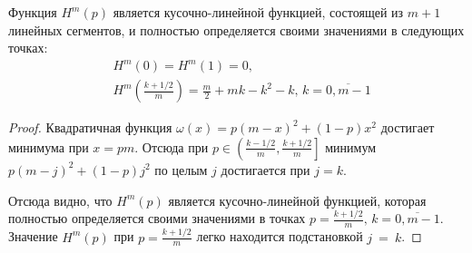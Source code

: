 \begin{lemma}
\label{lemma:upper_bound:function}
Функция $ H^m(p) $ является кусочно-линейной функцией, состоящей из $ m + 1 $ линейных сегментов, и полностью определяется своими значениями в следующих точках:
\begin{eqnarray*}
& H^m(0) = H^m(1) = 0, \\
& H^m\left(\frac{k+1/2}{m}\right) 
    = \frac{m}{2} + mk - k^2 - k, 
        \, k = \overline{0, m - 1}
\end{eqnarray*}
\end{lemma}
\begin{proof}
Квадратичная функция $ \omega(x) = p(m-x)^2 + (1-p)x^2 $ достигает минимума при $ x = pm $. 
Отсюда при $ p \in \left( \frac{k - 1/2}{m}, \frac{k+1/2}{m} \right] $ минимум $ p(m-j)^2 + (1-p)j^2 $ по целым $ j $ достигается при $ j = k $.
 
Отсюда видно, что $ H^m(p) $ является кусочно-линейной функцией, которая полностью определяется своими значениями в точках $ p = \frac{k+1/2}{m}, \, k = \overline{0, m-1} $. 
Значение $ H^m(p) $ при $ p = \frac{k+1/2}{m} $ легко находится подстановкой $ j~=~k $.
\end{proof}